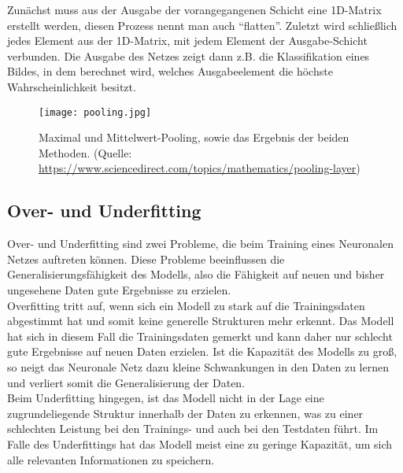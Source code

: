 Zunächst muss aus der Ausgabe der vorangegangenen Schicht eine 1D-Matrix erstellt werden, diesen Prozess nennt man auch ``flatten''. Zuletzt wird schließlich jedes Element aus der 1D-Matrix, mit jedem Element der Ausgabe-Schicht verbunden. Die Ausgabe des Netzes zeigt dann z.B. die Klassifikation eines Bildes, in dem berechnet wird, welches Ausgabeelement die höchste Wahrscheinlichkeit besitzt. \cite[vgl.][]{Weidman2020}

\begin{figure}
	\centering
	\texttt{[image: pooling.jpg]}
	\caption{Maximal und Mittelwert-Pooling, sowie das Ergebnis der beiden Methoden. (Quelle: \url{https://www.sciencedirect.com/topics/mathematics/pooling-layer})}
	\label{fig:pooling}
\end{figure}


\subsection{Over- und Underfitting}
Over- und Underfitting sind zwei Probleme, die beim Training eines Neuronalen Netzes auftreten können. Diese Probleme beeinflussen die Generalisierungsfähigkeit des Modells, also die Fähigkeit auf neuen und bisher ungesehene Daten gute Ergebnisse zu erzielen.\\
Overfitting tritt auf, wenn sich ein Modell zu stark auf die Trainingsdaten abgestimmt hat und somit keine generelle Strukturen mehr erkennt. Das \gls{Modell} hat sich in diesem Fall die Trainingsdaten gemerkt und kann daher nur schlecht gute Ergebnisse auf neuen Daten erzielen. Ist die Kapazität des \gls{Modell}s zu groß, so neigt das Neuronale Netz dazu kleine Schwankungen in den Daten zu lernen und verliert somit die Generalisierung der Daten.\\
Beim Underfitting hingegen, ist das \gls{Modell} nicht in der Lage eine zugrundeliegende Struktur innerhalb der Daten zu erkennen, was zu einer schlechten Leistung bei den Trainings- und auch bei den Testdaten führt. Im Falle des Underfittings hat das \gls{Modell} meist eine zu geringe Kapazität, um sich alle relevanten Informationen zu speichern.\cite[vgl.][]{Goodfellow2016}
